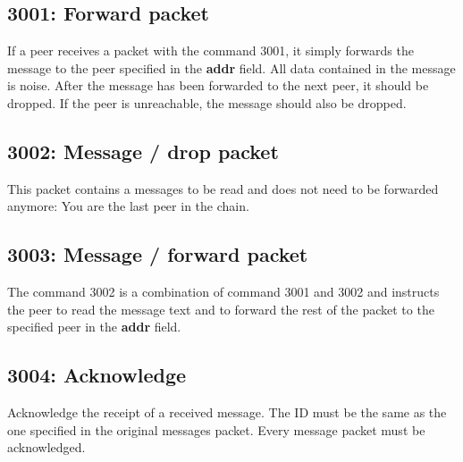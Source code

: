 \subsection{3001: Forward packet}
If a peer receives a packet with the command 3001, it simply forwards
the message to the peer specified in the \textbf{addr} field.
All data contained in the message
is noise. After the message has been forwarded to the next peer, it
should be dropped. If the peer is unreachable, the message should also
be dropped.
\subsection{3002: Message / drop packet}
This packet contains a messages to be read and does not need to be forwarded
anymore: You are the last peer in the chain.
\subsection{3003: Message / forward packet}
The command 3002 is a combination of command 3001 and 3002
and instructs the peer to read the message text and to forward the
rest of the packet to the specified peer in the \textbf{addr} field.
\subsection{3004: Acknowledge}
Acknowledge the receipt of a received message. The ID must be the same as
the one specified in the original messages packet.
Every message packet must be acknowledged.
